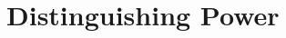 \documentclass{article}
\begin{document}
\section{Distinguishing Power}\label{sec:distinguising}


\begin{comment}
\begin{figure}[!tb]
  \begin{center}
    \hrule
    


\begin{gpicture}(50,34)(0,0)



\gasset{Nw=1.5,Nh=1.5,Nmr=.75, ExtNL=y, NLangle=180, NLdist=1, rdist=1, loopdiam=6}   






\node[Nmarks=n, Nfill=y, NLdist=1, NLangle=160](s1)(31,29){}
\node[Nmarks=n, Nfill=y, NLdist=1, NLangle=160](s2)(31,21){}
\node[Nmarks=n, Nfill=n, NLdist=1, NLangle=160](s3)(31,13){}


\node[Nmarks=n, Nfill=y, NLdist=1, NLangle=160](t1)(21,29){}
\node[Nmarks=n, Nfill=y, NLdist=1, NLangle=160](t2)(21,21){}
\node[Nmarks=n, Nfill=y, NLdist=1, NLangle=160](t3)(21,13){}
\node[Nmarks=n, Nfill=n, NLdist=1, NLangle=160](t4)(21,5){}


\drawedge[ELpos=50, ELside=r, curvedepth=0](s1,s2){}
\drawedge[ELpos=50, ELside=r, curvedepth=0](s1,t2){}
\drawedge[ELpos=50, ELside=r, curvedepth=0](s2,s3){}
\drawloop[ELpos=50, loopangle=225, loopdiam=3](s3){}


\drawedge[ELpos=50, ELside=r, curvedepth=0](t1,t2){}
\drawedge[ELpos=50, ELside=r, curvedepth=0](t2,t3){}
\drawedge[ELpos=50, ELside=r, curvedepth=0](t3,t4){}
\drawloop[ELpos=50, loopangle=225, loopdiam=3](t4){}




















\end{gpicture}


     \hrule
    \caption{The states  and  are stuttering bisimilar (they satisfy the same CTL formulas
without the Next operator), but they can be distinguished by the CTL+Sync formula
 which holds in  but not in . \label{fig:stut-bisimilar-distinguishable}}
  \end{center}
\end{figure}
\end{comment}
\end{document}
